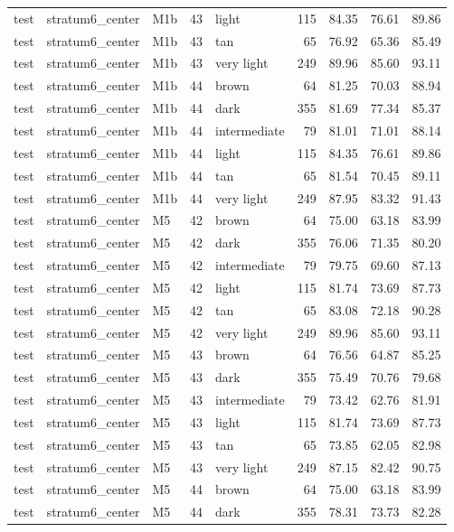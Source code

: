 \begin{tabular}{lllrlrrrr}
test & stratum6\_center & M1b & 43 & light & 115 & 84.35 & 76.61 & 89.86 \\
test & stratum6\_center & M1b & 43 & tan & 65 & 76.92 & 65.36 & 85.49 \\
test & stratum6\_center & M1b & 43 & very light & 249 & 89.96 & 85.60 & 93.11 \\
test & stratum6\_center & M1b & 44 & brown & 64 & 81.25 & 70.03 & 88.94 \\
test & stratum6\_center & M1b & 44 & dark & 355 & 81.69 & 77.34 & 85.37 \\
test & stratum6\_center & M1b & 44 & intermediate & 79 & 81.01 & 71.01 & 88.14 \\
test & stratum6\_center & M1b & 44 & light & 115 & 84.35 & 76.61 & 89.86 \\
test & stratum6\_center & M1b & 44 & tan & 65 & 81.54 & 70.45 & 89.11 \\
test & stratum6\_center & M1b & 44 & very light & 249 & 87.95 & 83.32 & 91.43 \\
test & stratum6\_center & M5 & 42 & brown & 64 & 75.00 & 63.18 & 83.99 \\
test & stratum6\_center & M5 & 42 & dark & 355 & 76.06 & 71.35 & 80.20 \\
test & stratum6\_center & M5 & 42 & intermediate & 79 & 79.75 & 69.60 & 87.13 \\
test & stratum6\_center & M5 & 42 & light & 115 & 81.74 & 73.69 & 87.73 \\
test & stratum6\_center & M5 & 42 & tan & 65 & 83.08 & 72.18 & 90.28 \\
test & stratum6\_center & M5 & 42 & very light & 249 & 89.96 & 85.60 & 93.11 \\
test & stratum6\_center & M5 & 43 & brown & 64 & 76.56 & 64.87 & 85.25 \\
test & stratum6\_center & M5 & 43 & dark & 355 & 75.49 & 70.76 & 79.68 \\
test & stratum6\_center & M5 & 43 & intermediate & 79 & 73.42 & 62.76 & 81.91 \\
test & stratum6\_center & M5 & 43 & light & 115 & 81.74 & 73.69 & 87.73 \\
test & stratum6\_center & M5 & 43 & tan & 65 & 73.85 & 62.05 & 82.98 \\
test & stratum6\_center & M5 & 43 & very light & 249 & 87.15 & 82.42 & 90.75 \\
test & stratum6\_center & M5 & 44 & brown & 64 & 75.00 & 63.18 & 83.99 \\
test & stratum6\_center & M5 & 44 & dark & 355 & 78.31 & 73.73 & 82.28 \\

\end{tabular}
